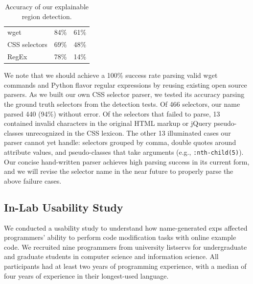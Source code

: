 \begin{changes}
\begin{table}
\caption{Accuracy of our explainable region detection.}
\label{tab:detection_accuracy}
\centering
\begin{tabular}{llc}
\toprule
\headrow{Language} & \headrow{Precision} & \headrow{Recall} \\
\midrule
wget & 84\% & 61\% \\ \midrule
CSS selectors & 69\% & 48\% \\ \midrule
RegEx & 78\% & 14\% \\ \bottomrule
\end{tabular}
\end{table}
\fi

We note that we should achieve a 100\% success rate parsing valid wget commands and Python flavor regular expressions by reusing existing open source parsers.
As we built our own CSS selector parser, we tested its accuracy parsing the ground truth selectors from the detection tests.
Of 466 selectors, our \Gls{name} parsed 440 (94\%) without error.
Of the selectors that failed to parse, 13 contained invalid characters in the original HTML markup or jQuery pseudo-classes unrecognized in the CSS lexicon.
The other 13 illuminated cases our parser cannot yet handle: selectors grouped by comma, double quotes around attribute values, and pseudo-classes that take arguments (e.g., \texttt{:nth-child(5)}).
Our concise hand-written parser achieves high parsing success in its current form, and we will revise the selector \Gls{name} in the near future to properly parse the above failure cases.

\end{changes}

\subsection{In-Lab Usability Study}

We conducted a usability study to understand how \Gls{name}-generated \glspl{exp} affected programmers' ability to perform code modification tasks with online example code.
We recruited nine programmers from university listservs for undergraduate and graduate students in computer science and information science.
All participants had at least two years of programming experience, with a median of four years of experience in their longest-used language.

